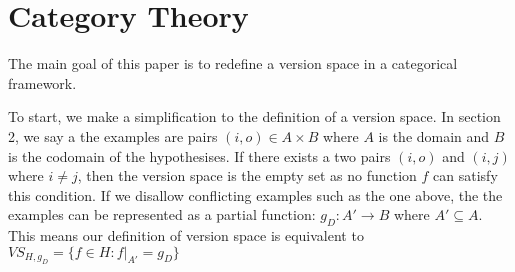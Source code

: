 \documentclass{article}
\theoremstyle{definition}
\begin{document}
\section{Category Theory}
The main goal of this paper is to redefine a version space in a categorical framework.

To start, we make a simplification to the definition of a version space. In section 2, we say a the examples are pairs $(i, o) \in A\times B$ where $A$ is the domain and $B$ is the codomain of the hypothesises. If there exists a two pairs $(i, o)$ and $(i, j)$ where $i\neq j$, then the version space is the empty set as no function $f$ can satisfy this condition. If we disallow conflicting examples such as the one above, the the examples can be represented as a partial function: $g_D : A' \rightarrow B$ where $A' \subseteq A$. This means our definition of version space is equivalent to $VS_{H,g_D} = \{f \in H : f|_{A'} = g_D\}$
\end{document}
